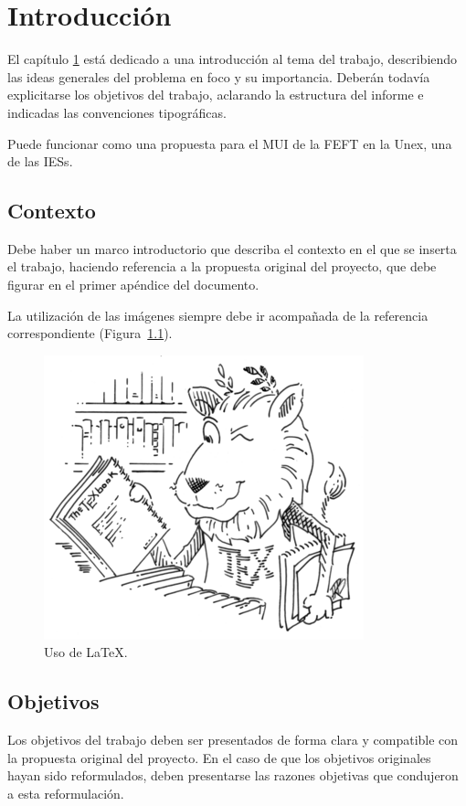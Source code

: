 \chapter{Introducción}\label{cap:intro}

El capítulo \ref {cap:intro} está dedicado a una introducción al tema del trabajo, describiendo las ideas generales del problema en foco y su importancia. Deberán todavía explicitarse los objetivos del trabajo, aclarando la estructura del informe e indicadas las convenciones tipográficas.

Puede funcionar como una propuesta para el \gls{MUI} de la \gls{FEFT} en la \gls{Unex}, una de las \glspl{IES}.

\section{Contexto}

Debe haber un marco introductorio que describa el contexto en el que se inserta el trabajo, haciendo referencia a la propuesta original del proyecto, que debe figurar en el primer apéndice del documento.

La utilización de las imágenes siempre debe ir acompañada de la referencia correspondiente (Figura~\ref{fig:latex}).

\begin{figure}
\centering
\includegraphics[width=0.5\columnwidth]{images/lion_large.png}
\caption{Uso de \LaTeX.}
\label{fig:latex}
\end{figure}

\section{Objetivos}

Los objetivos del trabajo deben ser presentados de forma clara y compatible con la propuesta original del proyecto. En el caso de que los objetivos originales hayan sido reformulados, deben presentarse las razones objetivas que condujeron a esta reformulación.


